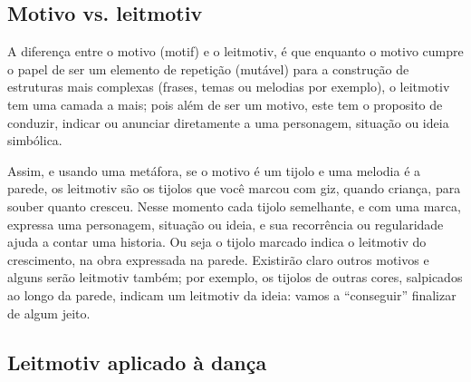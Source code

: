 \subsection{Motivo vs. leitmotiv}
A diferença entre o motivo (motif) e o leitmotiv, 
é que  enquanto o motivo cumpre o papel de ser um elemento de repetição (mutável)
para a construção de estruturas mais complexas (frases, temas ou melodias por exemplo),
o leitmotiv tem uma camada a mais; pois além de ser um motivo, 
este tem o proposito de conduzir, indicar ou anunciar diretamente
a uma personagem, situação ou ideia simbólica.

Assim, e usando uma metáfora, se o motivo é um tijolo e uma melodia é a parede, 
os leitmotiv são os tijolos que  você marcou com giz, quando criança, para souber quanto cresceu.
Nesse momento cada tijolo semelhante, e com uma marca, expressa uma personagem, situação ou ideia,
e sua recorrência ou regularidade ajuda a contar uma historia.
Ou seja o tijolo marcado indica o leitmotiv do crescimento, na obra expressada na parede.
Existirão claro outros motivos e alguns serão leitmotiv também; por exemplo, os tijolos de outras cores,
salpicados ao longo da parede, indicam um leitmotiv da ideia: vamos  a ``conseguir'' finalizar de algum jeito.



\subsection{Leitmotiv aplicado à dança}

